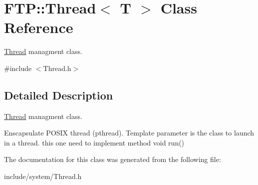 \hypertarget{class_f_t_p_1_1_thread_3_01_t_01_4}{\section{F\-T\-P\-:\-:Thread$<$ T $>$ Class Reference}
\label{class_f_t_p_1_1_thread_3_01_t_01_4}
}


\hyperlink{class_f_t_p_1_1_thread}{Thread} managment class.  




{\ttfamily \#include $<$Thread.\-h$>$}



\subsection{Detailed Description}
\hyperlink{class_f_t_p_1_1_thread}{Thread} managment class. 

Enscapsulate P\-O\-S\-I\-X thread (pthread). Template parameter is the class to launch in a thread. this one need to implement method void run() 

The documentation for this class was generated from the following file\-:\begin{DoxyCompactItemize}
\item 
include/system/Thread.\-h\end{DoxyCompactItemize}

